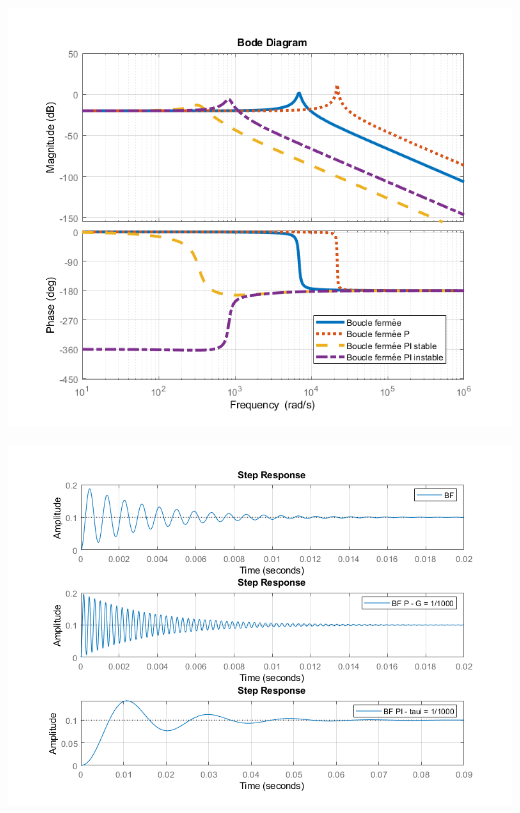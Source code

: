 \documentclass[a4paper,french]{paper}
\begin{document}
	\begin{center}
		\includegraphics[width=14cm]{images/TD/bode_PI_corr.png}
	\end{center}	
	
	\begin{center}
		\includegraphics[width=14cm]{images/TD/step_PI_corr.png}
	\end{center}
\end{document}
